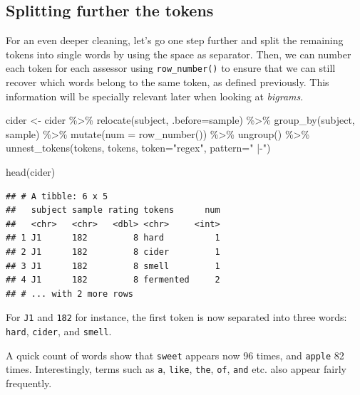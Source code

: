 \documentclass[
]{krantz}
\makeatletter
\newenvironment{Shaded}{\begin{snugshade}}{\end{snugshade}}
\newcommand{\AttributeTok}[1]{\textcolor[rgb]{0.61,0.61,0.61}{#1}}
\newcommand{\FunctionTok}[1]{\textcolor[rgb]{0,0,0}{#1}}
\newcommand{\NormalTok}[1]{#1}
\newcommand{\OtherTok}[1]{\textcolor[rgb]{0.37,0.37,0.37}{#1}}
\newcommand{\SpecialCharTok}[1]{\textcolor[rgb]{0,0,0}{#1}}
\newcommand{\StringTok}[1]{\textcolor[rgb]{0.5,0.5,0.5}{#1}}
\newenvironment{kframe}{%
\medskip{}
\setlength{\fboxsep}{.8em}
 \def\at@end@of@kframe{}%
 \ifinner\ifhmode%
  \def\at@end@of@kframe{\end{minipage}}%
  \begin{minipage}{\columnwidth}%
 \fi\fi%
 \def\FrameCommand##1{\hskip\@totalleftmargin \hskip-\fboxsep
 \colorbox{shadecolor}{##1}\hskip-\fboxsep
     \hskip-\linewidth \hskip-\@totalleftmargin \hskip\columnwidth}%
 \MakeFramed {\advance\hsize-\width
   \@totalleftmargin\z@ \linewidth\hsize
   \@setminipage}}%
 {\par\unskip\endMakeFramed%
 \at@end@of@kframe}
\renewenvironment{Shaded}{\begin{kframe}}{\end{kframe}}
\makeatother
\begin{document}
\hypertarget{splitting-further-the-tokens}{%
\subsection{Splitting further the tokens}\label{splitting-further-the-tokens}}

For an even deeper cleaning, let's go one step further and split the remaining tokens into single words by using the space as separator. Then, we can number each token for each assessor using \texttt{row\_number()} to ensure that we can still recover which words belong to the same token, as defined previously. This information will be specially relevant later when looking at \emph{bigrams}.

\begin{Shaded}
\begin{Highlighting}[]
\NormalTok{cider }\OtherTok{\textless{}{-}}\NormalTok{ cider }\SpecialCharTok{\%\textgreater{}\%} 
  \FunctionTok{relocate}\NormalTok{(subject, }\AttributeTok{.before=}\NormalTok{sample) }\SpecialCharTok{\%\textgreater{}\%} 
  \FunctionTok{group\_by}\NormalTok{(subject, sample) }\SpecialCharTok{\%\textgreater{}\%} 
  \FunctionTok{mutate}\NormalTok{(}\AttributeTok{num =} \FunctionTok{row\_number}\NormalTok{()) }\SpecialCharTok{\%\textgreater{}\%} 
  \FunctionTok{ungroup}\NormalTok{() }\SpecialCharTok{\%\textgreater{}\%} 
  \FunctionTok{unnest\_tokens}\NormalTok{(tokens, tokens, }\AttributeTok{token=}\StringTok{"regex"}\NormalTok{, }\AttributeTok{pattern=}\StringTok{" |{-}"}\NormalTok{)}

\FunctionTok{head}\NormalTok{(cider)}
\end{Highlighting}
\end{Shaded}

\begin{verbatim}
## # A tibble: 6 x 5
##   subject sample rating tokens      num
##   <chr>   <chr>   <dbl> <chr>     <int>
## 1 J1      182         8 hard          1
## 2 J1      182         8 cider         1
## 3 J1      182         8 smell         1
## 4 J1      182         8 fermented     2
## # ... with 2 more rows
\end{verbatim}

For \texttt{J1} and \texttt{182} for instance, the first token is now separated into three words: \texttt{hard}, \texttt{cider}, and \texttt{smell}.

A quick count of words show that \texttt{sweet} appears now 96 times, and \texttt{apple} 82 times. Interestingly, terms such as \texttt{a}, \texttt{like}, \texttt{the}, \texttt{of}, \texttt{and} etc. also appear fairly frequently.
\end{document}
